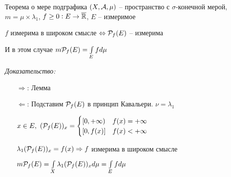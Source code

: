 \documentclass[12pt]{article}
\begin{document}
\begin{theo}{Теорема о мере подграфика}
    $(X, \A, \mu)$ -- пространство с $\sigma$-конечной мерой, $m = \mu \times \lambda_1$, $f \geq 0 : E \to \ol{\R}$, $E$ -- измеримое 

    $f$ измерима в широком смысле $\Leftrightarrow \P_f(E)$ -- измерима 

    И в этом случае $m\P_f(E) = \int\limits_E fd\mu$
\end{theo}

\textit{Доказательство:}

\begin{itemize}
    \item[$\Rightarrow$: ] Лемма 
    \item[$\Leftarrow$: ] Подставим $\P_f(E)$ в принцип Кавальери. $\nu = \lambda_1$
    
    $x \in E,\ (\P_f(E))_x = \begin{cases}
        [0, + \infty) & f(x) = + \infty \\
        [0, f(x)] & f(x) < + \infty
    \end{cases}$

    $\lambda_1(\P_f(E))_x = f(x) \Rightarrow f$ измерима в широком смысле 

    $m\P_f(E) = \int\limits_X \lambda_1(\P_f(E))_xd\mu = \int\limits_E fd\mu$
\end{itemize}
\end{document}
